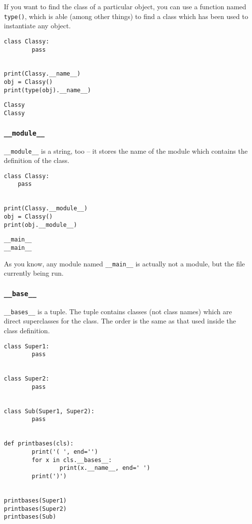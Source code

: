 \documentclass[11pt]{article}
\begin{document}
If you want to find the class of a particular object, you can use a
function named \texttt{type()}, which is able (among other things) to find a
class which has been used to instantiate any object.

\begin{verbatim}
class Classy:
        pass


print(Classy.__name__)
obj = Classy()
print(type(obj).__name__)
\end{verbatim}

\begin{verbatim}
Classy
Classy
\end{verbatim}

\subsubsection{\texttt{\_\_module\_\_}}
\label{sec:org5c3197a}
\texttt{\_\_module\_\_} is a string, too – it stores the name of the module which
contains the definition of the class.

\begin{verbatim}
class Classy:
    pass


print(Classy.__module__)
obj = Classy()
print(obj.__module__)
\end{verbatim}

\begin{verbatim}
__main__
__main__
\end{verbatim}

As you know, any module named \texttt{\_\_main\_\_} is actually not a module, but
the file currently being run.

\subsubsection{\texttt{\_\_base\_\_}}
\label{sec:org05a2c41}
\texttt{\_\_bases\_\_} is a tuple. The tuple contains classes (not class names)
which are direct superclasses for the class. The order is the same as
that used inside the class definition.

\begin{verbatim}
class Super1:
        pass


class Super2:
        pass


class Sub(Super1, Super2):
        pass


def printbases(cls):
        print('( ', end='')
        for x in cls.__bases__:
                print(x.__name__, end=' ')
        print(')')


printbases(Super1)
printbases(Super2)
printbases(Sub)

\end{verbatim}
\end{document}
